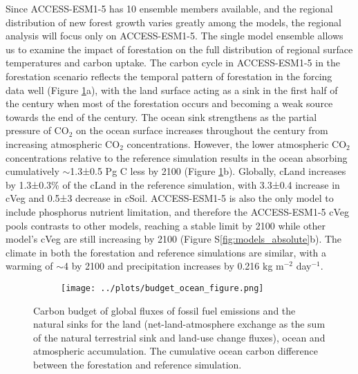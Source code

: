\documentclass[]{article}
\begin{document}
Since ACCESS-ESM1-5 has 10 ensemble members available, and the regional distribution of new forest growth varies greatly among the models, the regional analysis will focus only on ACCESS-ESM1-5.
The single model ensemble allows us to examine the impact of forestation on the full distribution of regional surface temperatures and carbon uptake.
The carbon cycle in ACCESS-ESM1-5 in the forestation scenario reflects the temporal pattern of forestation in the forcing data well (Figure \ref{fig:global_carbon_budget}a), with the land surface acting as a sink in the first half of the century when most of the forestation occurs and becoming a weak source towards the end of the century.
The ocean sink strengthens as the partial pressure of CO$_2$ on the ocean surface increases throughout the century from increasing atmospheric CO$_2$ concentrations.
However, the lower atmospheric CO$_2$ concentrations relative to the reference simulation results in the ocean absorbing cumulatively $\sim$1.3±0.5 Pg C less by 2100 (Figure \ref{fig:global_carbon_budget}b).
Globally, cLand increases by 1.3±0.3\% of the cLand in the reference simulation, with 3.3±0.4 increase in cVeg and 0.5±3 decrease in cSoil.
ACCESS-ESM1-5 is also the only model to include phosphorus nutrient limitation, and therefore the ACCESS-ESM1-5 cVeg pools contrasts to other models, reaching a stable limit by 2100 while other model's cVeg are still increasing by 2100 (Figure S\ref{fig:models_absolute}b).
The climate in both the forestation and reference simulations are similar, with a warming of $\sim$4 \textcelsius{} by 2100 and precipitation increases by 0.216 kg m$^{-2}$ day$^{-1}$.

\begin{figure}[H]
    \centering
    \begin{subfigure}[b]{\linewidth}
        \texttt{[image: ../plots/budget\_ocean\_figure.png]}
    \end{subfigure}
    \caption{Carbon budget of global fluxes of fossil fuel emissions and the natural sinks for the land (net-land-atmosphere exchange as the sum of the natural terrestrial sink and land-use change fluxes), ocean and atmospheric accumulation. The cumulative ocean carbon difference between the forestation and reference simulation.}
    \label{fig:global_carbon_budget}
\end{figure}
\end{document}
